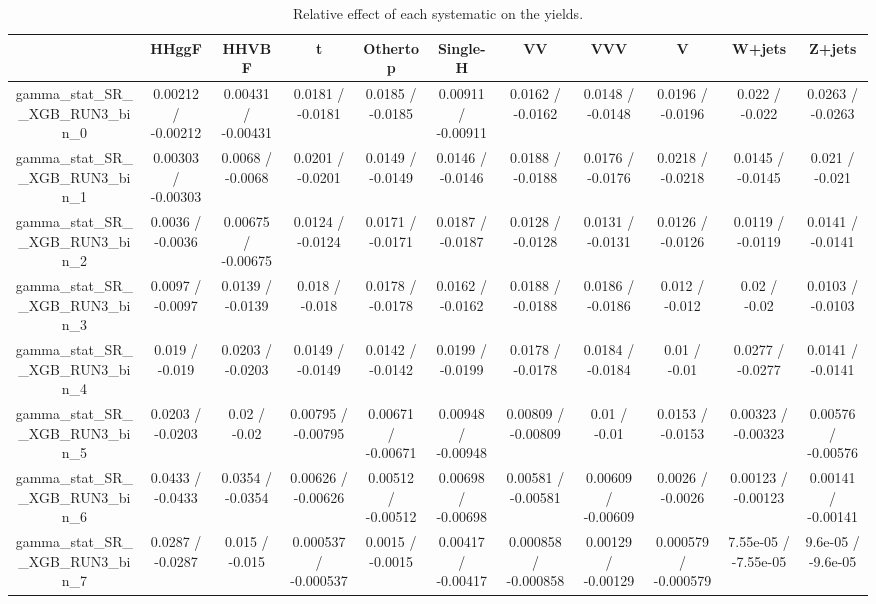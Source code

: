 \documentclass[10pt]{article}
\begin{document}
\begin{table}[htbp]
\begin{center}
\begin{tabular}{|c|c|c|c|c|c|c|c|c|c|c|}
\hline 
      & HHggF      & HHVBF      & t      & Othertop      & Single-H      & VV      & VVV      & V      & W+jets      & Z+jets \\ 
\hline 
  gamma_stat_SR__XGB_RUN3_bin_0 & 0.00212 / -0.00212 & 0.00431 / -0.00431 & 0.0181 / -0.0181 & 0.0185 / -0.0185 & 0.00911 / -0.00911 & 0.0162 / -0.0162 & 0.0148 / -0.0148 & 0.0196 / -0.0196 & 0.022 / -0.022 & 0.0263 / -0.0263 \\ 
  gamma_stat_SR__XGB_RUN3_bin_1 & 0.00303 / -0.00303 & 0.0068 / -0.0068 & 0.0201 / -0.0201 & 0.0149 / -0.0149 & 0.0146 / -0.0146 & 0.0188 / -0.0188 & 0.0176 / -0.0176 & 0.0218 / -0.0218 & 0.0145 / -0.0145 & 0.021 / -0.021 \\ 
  gamma_stat_SR__XGB_RUN3_bin_2 & 0.0036 / -0.0036 & 0.00675 / -0.00675 & 0.0124 / -0.0124 & 0.0171 / -0.0171 & 0.0187 / -0.0187 & 0.0128 / -0.0128 & 0.0131 / -0.0131 & 0.0126 / -0.0126 & 0.0119 / -0.0119 & 0.0141 / -0.0141 \\ 
  gamma_stat_SR__XGB_RUN3_bin_3 & 0.0097 / -0.0097 & 0.0139 / -0.0139 & 0.018 / -0.018 & 0.0178 / -0.0178 & 0.0162 / -0.0162 & 0.0188 / -0.0188 & 0.0186 / -0.0186 & 0.012 / -0.012 & 0.02 / -0.02 & 0.0103 / -0.0103 \\ 
  gamma_stat_SR__XGB_RUN3_bin_4 & 0.019 / -0.019 & 0.0203 / -0.0203 & 0.0149 / -0.0149 & 0.0142 / -0.0142 & 0.0199 / -0.0199 & 0.0178 / -0.0178 & 0.0184 / -0.0184 & 0.01 / -0.01 & 0.0277 / -0.0277 & 0.0141 / -0.0141 \\ 
  gamma_stat_SR__XGB_RUN3_bin_5 & 0.0203 / -0.0203 & 0.02 / -0.02 & 0.00795 / -0.00795 & 0.00671 / -0.00671 & 0.00948 / -0.00948 & 0.00809 / -0.00809 & 0.01 / -0.01 & 0.0153 / -0.0153 & 0.00323 / -0.00323 & 0.00576 / -0.00576 \\ 
  gamma_stat_SR__XGB_RUN3_bin_6 & 0.0433 / -0.0433 & 0.0354 / -0.0354 & 0.00626 / -0.00626 & 0.00512 / -0.00512 & 0.00698 / -0.00698 & 0.00581 / -0.00581 & 0.00609 / -0.00609 & 0.0026 / -0.0026 & 0.00123 / -0.00123 & 0.00141 / -0.00141 \\ 
  gamma_stat_SR__XGB_RUN3_bin_7 & 0.0287 / -0.0287 & 0.015 / -0.015 & 0.000537 / -0.000537 & 0.0015 / -0.0015 & 0.00417 / -0.00417 & 0.000858 / -0.000858 & 0.00129 / -0.00129 & 0.000579 / -0.000579 & 7.55e-05 / -7.55e-05 & 9.6e-05 / -9.6e-05 \\ 
\hline 
\end{tabular} 
\caption{Relative effect of each systematic on the yields.} 
\end{center} 
\end{table} 
\end{document}
